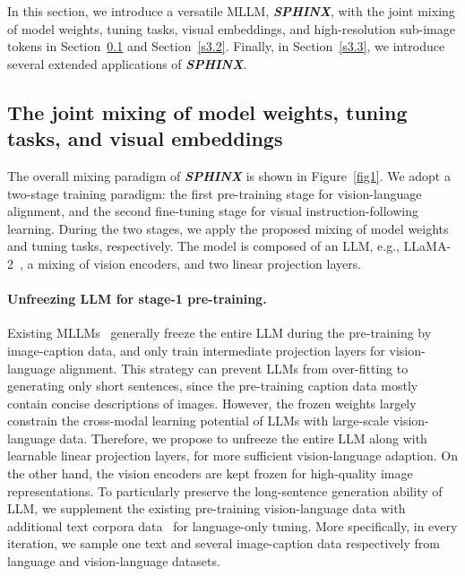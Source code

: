 \documentclass{article} \usepackage{iclr2024_conference,times}
\begin{document}
In this section, we introduce a versatile MLLM, \textcolor{Goldenrod3}{\textbf{\textit{SPHINX}}}, with the joint mixing of model weights, tuning tasks, visual embeddings, and high-resolution sub-image tokens in Section~\ref{s3.1} and Section~\ref{s3.2}. Finally, in Section~\ref{s3.3}, we introduce several extended applications of \textcolor{Goldenrod3}{\textbf{\textit{SPHINX}}}.


\subsection{The joint mixing of model weights, tuning tasks, and visual embeddings}
\label{s3.1}

The overall mixing paradigm of \textcolor{Goldenrod3}{\textbf{\textit{SPHINX}}} is shown in Figure~\ref{fig1}. We adopt a two-stage training paradigm: the first pre-training stage for vision-language alignment, and the second fine-tuning stage for visual instruction-following learning. During the two stages, we apply the proposed mixing of model weights and tuning tasks, respectively. The model is composed of an LLM, e.g., LLaMA-2~\citep{Touvron2023Llama2O}, a mixing of vision encoders, and two linear projection layers. 

\paragraph{Unfreezing LLM for stage-1 pre-training.}
Existing MLLMs~\citep{zhu2023minigpt,li2023blip,Dai2023InstructBLIPTG} generally freeze the entire LLM during the pre-training by image-caption data, and only train intermediate projection layers for vision-language alignment. This strategy can prevent LLMs from over-fitting to generating only short sentences, since the pre-training caption data mostly contain concise descriptions of images. However, the frozen weights largely constrain the cross-modal learning potential of LLMs with large-scale vision-language data. Therefore, we propose to unfreeze the entire LLM along with learnable linear projection layers, for more sufficient vision-language adaption. On the other hand, the vision encoders are kept frozen for high-quality image representations.
To particularly preserve the long-sentence generation ability of LLM, we supplement the existing pre-training vision-language data with additional text corpora data~\cite{Penedo2023TheRD} for language-only tuning. More specifically, in every iteration, we sample one text and several image-caption data respectively from language and vision-language datasets. 
\end{document}
